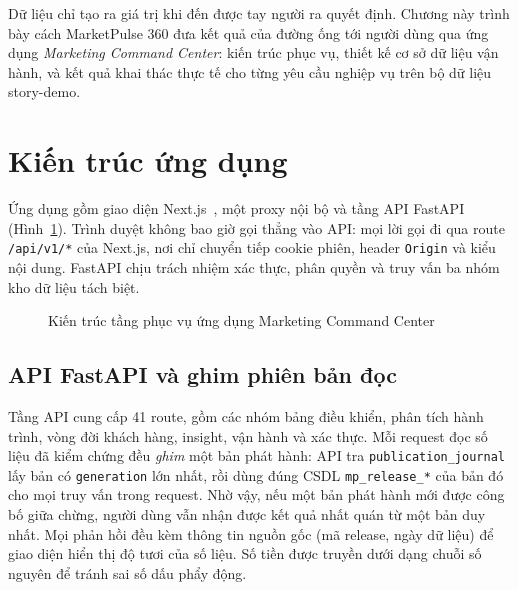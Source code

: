 
Dữ liệu chỉ tạo ra giá trị khi đến được tay người ra quyết định. Chương này trình bày cách MarketPulse 360 đưa kết quả của đường ống tới người dùng qua ứng dụng \emph{Marketing Command Center}: kiến trúc phục vụ, thiết kế cơ sở dữ liệu vận hành, và kết quả khai thác thực tế cho từng yêu cầu nghiệp vụ trên bộ dữ liệu story-demo.

\section{Kiến trúc ứng dụng}
\label{sec:c4-kien-truc}

Ứng dụng gồm giao diện Next.js~\cite{nextjsdocs}, một proxy nội bộ và tầng API FastAPI~\cite{fastapidocs} (Hình~\ref{fig:app-architecture}). Trình duyệt không bao giờ gọi thẳng vào API: mọi lời gọi đi qua route \texttt{/api/v1/*} của Next.js, nơi chỉ chuyển tiếp cookie phiên, header \texttt{Origin} và kiểu nội dung. FastAPI chịu trách nhiệm xác thực, phân quyền và truy vấn ba nhóm kho dữ liệu tách biệt.

\begin{figure}[H]
    \centering
    \resizebox{\textwidth}{!}{}
    \caption{Kiến trúc tầng phục vụ ứng dụng Marketing Command Center}
    \label{fig:app-architecture}
\end{figure}

\subsection{API FastAPI và ghim phiên bản đọc}
\label{sec:c4-api}
Tầng API cung cấp 41 route, gồm các nhóm bảng điều khiển, phân tích hành trình, vòng đời khách hàng, insight, vận hành và xác thực. Mỗi request đọc số liệu đã kiểm chứng đều \emph{ghim} một bản phát hành: API tra \texttt{publication\_journal} lấy bản có \texttt{generation} lớn nhất, rồi dùng đúng CSDL \texttt{mp\_release\_*} của bản đó cho mọi truy vấn trong request. Nhờ vậy, nếu một bản phát hành mới được công bố giữa chừng, người dùng vẫn nhận được kết quả nhất quán từ một bản duy nhất. Mọi phản hồi đều kèm thông tin nguồn gốc (mã release, ngày dữ liệu) để giao diện hiển thị độ tươi của số liệu. Số tiền được truyền dưới dạng chuỗi số nguyên để tránh sai số dấu phẩy động.

